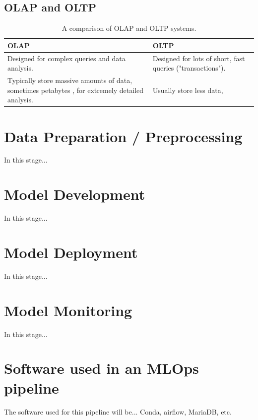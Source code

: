 \documentclass[12pt]{report}
\begin{document}
\subsection{OLAP and OLTP}


\begin{table}[H]
    \centering
        \begin{tabular}{ |p{}| p{}|}
            \hline
            \cellcolor{blue!25}OLAP & \cellcolor{blue!25}OLTP\\
            \hline
            Designed for complex queries and data analysis.
            & Designed for lots of short, fast queries ("transactions").\\
            \hline
            Typically store massive amounts of data, sometimes petabytes \autocite{aws_oltp_nodate},
            for extremely detailed analysis. 
            & Usually store less data, 
    \end{tabular}
    \caption{A comparison of OLAP and OLTP systems.}\label{tab:OLAP-OLTP}
\end{table}

\section{Data Preparation / Preprocessing}
In this stage...

\section{Model Development}
In this stage...

\section{Model Deployment}
In this stage...

\section{Model Monitoring}
In this stage...

\section{Software used in an MLOps pipeline}\label{sec:Software}
The software used for this pipeline will be... 
Conda, airflow, MariaDB, etc.

\printbibliography
\end{document}
